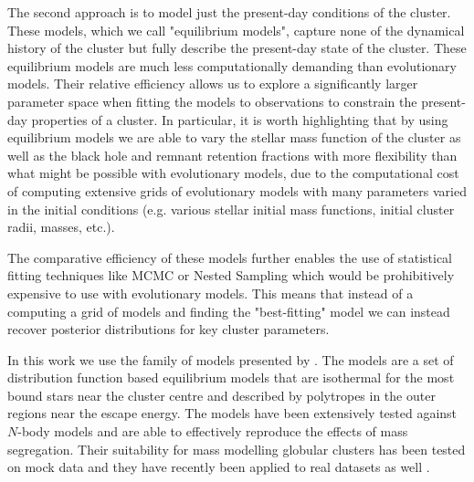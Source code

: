 The second approach is to model just the present-day conditions of the cluster. These models, which
we call "equilibrium models", capture none of the dynamical history of the cluster but fully
describe the present-day state of the cluster. These equilibrium models are much less
computationally demanding than evolutionary models. Their relative efficiency allows us to explore a
significantly larger parameter space when fitting the models to observations to constrain the
present-day properties of a cluster. In particular, it is worth highlighting that by using
equilibrium models we are able to vary the stellar mass function of the cluster as well as the black
hole and remnant retention fractions with more flexibility than what might be possible with
evolutionary models, due to the computational cost of computing extensive grids of evolutionary
models with many parameters varied in the initial conditions (e.g. various stellar initial mass
functions, initial cluster radii, masses, etc.).

The comparative efficiency of these models further enables the use of statistical fitting techniques
like MCMC or Nested Sampling which would be prohibitively expensive to use with evolutionary models.
This means that instead of a computing a grid of models and finding the "best-fitting" model we can
instead recover posterior distributions for key cluster parameters.


In this work we use the  family of models presented by \citet{Gieles2015}. The
 models are a set of distribution function based equilibrium models that are isothermal
for the most bound stars near the cluster centre and described by polytropes in the outer regions
near the escape energy. The models have been extensively tested against $N$-body models
\citep{Zocchi2016, Peuten2017} and are able to effectively reproduce the effects of mass
segregation. Their suitability for mass modelling globular clusters has been tested on mock data
\citep{Henault-Brunet2019} and they have recently been applied to real datasets as well
\citep[e.g.][]{Gieles2018, Henault-Brunet2020}.


